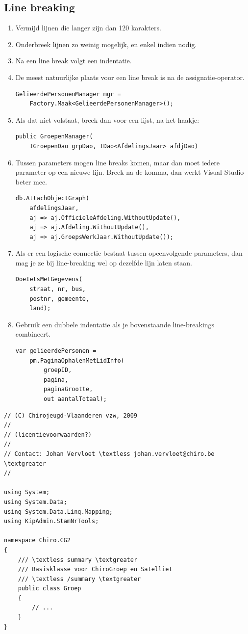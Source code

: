 \documentclass[a4paper,11pt]{article}
\begin{document}
\subsection{Line breaking}
\begin{enumerate}[resume]
\item Vermijd lijnen die langer zijn dan 120 karakters.
\item Onderbreek lijnen zo weinig mogelijk, en enkel indien nodig.
\item Na een line break volgt een indentatie.
\item De meest natuurlijke plaats voor een line break is na de
assignatie-operator.
\begin{lstlisting}
GelieerdePersonenManager mgr =
	Factory.Maak<GelieerdePersonenManager>();
\end{lstlisting}
\item Als dat niet volstaat, breek dan voor een lijst, na het haakje:
\begin{lstlisting}
public GroepenManager(
	IGroepenDao grpDao, IDao<AfdelingsJaar> afdjDao)
\end{lstlisting}
\item Tussen parameters mogen line breaks komen, maar dan moet iedere
parameter op een nieuwe lijn.  Breek na de komma, dan werkt Visual Studio
beter mee.
\begin{lstlisting}
db.AttachObjectGraph(
	afdelingsJaar,
	aj => aj.OfficieleAfdeling.WithoutUpdate(),
	aj => aj.Afdeling.WithoutUpdate(),
	aj => aj.GroepsWerkJaar.WithoutUpdate());
\end{lstlisting}
\item Als er een logische connectie bestaat tussen opeenvolgende parameters,
dan mag je ze bij line-breaking wel op dezelfde lijn laten staan.
\begin{lstlisting}
DoeIetsMetGegevens(
	straat, nr, bus,
	postnr, gemeente,
	land);
\end{lstlisting}
\item Gebruik een dubbele indentatie als je bovenstaande line-breakings
combineert.
\begin{lstlisting}
var gelieerdePersonen =
	pm.PaginaOphalenMetLidInfo(
		groepID,
		pagina,
		paginaGrootte,
		out aantalTotaal);
\end{lstlisting}
\end{enumerate}

\begin{lstlisting}[float, caption=Opbouw, label=lblLstOpbouw]
// (C) Chirojeugd-Vlaanderen vzw, 2009
//
// (licentievoorwaarden?)
//
// Contact: Johan Vervloet \textless johan.vervloet@chiro.be \textgreater
//

using System;
using System.Data;
using System.Data.Linq.Mapping;
using KipAdmin.StamNrTools;

namespace Chiro.CG2
{
	/// \textless summary \textgreater
	/// Basisklasse voor ChiroGroep en Satelliet
	/// \textless /summary \textgreater
	public class Groep
	{
		// ...
	}
}
\end{lstlisting}
\end{document}
